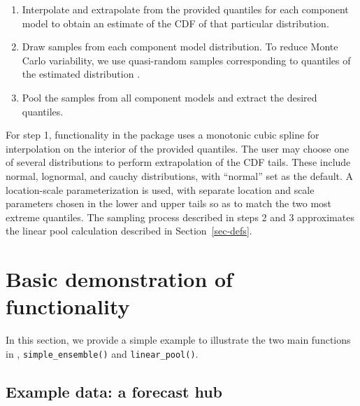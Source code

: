 \documentclass[
  article,
  shortnames,
  notitle]{jss}
\providecommand{\tightlist}{%
  \setlength{\itemsep}{0pt}\setlength{\parskip}{0pt}}\usepackage{longtable,booktabs,array}
\begin{document}
\begin{enumerate}
\def\labelenumi{\arabic{enumi}.}
\tightlist
\item
  Interpolate and extrapolate from the provided quantiles for each
  component model to obtain an estimate of the CDF of that particular
  distribution.
\item
  Draw samples from each component model distribution. To reduce Monte
  Carlo variability, we use quasi-random samples corresponding to
  quantiles of the estimated distribution
  \citep{niederreiter1992quasirandom}.
\item
  Pool the samples from all component models and extract the desired
  quantiles.
\end{enumerate}

For step 1, functionality in the  package uses a
monotonic cubic spline for interpolation on the interior of the provided
quantiles. The user may choose one of several distributions to perform
extrapolation of the CDF tails. These include normal, lognormal, and
cauchy distributions, with ``normal'' set as the default. A
location-scale parameterization is used, with separate location and
scale parameters chosen in the lower and upper tails so as to match the
two most extreme quantiles. The sampling process described in steps 2
and 3 approximates the linear pool calculation described in
Section~\ref{sec-defs}.

\section{Basic demonstration of functionality}\label{sec-simple-ex}

In this section, we provide a simple example to illustrate the two main
functions in , \texttt{simple\_ensemble()} and
\texttt{linear\_pool()}.

\subsection{Example data: a forecast
hub}\label{example-data-a-forecast-hub}
\end{document}
